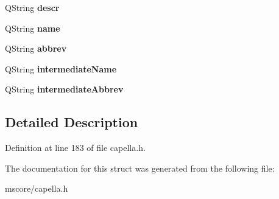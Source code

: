 \begin{DoxyCompactItemize}
Q\+String {\bfseries descr}
\item 
\mbox{\label{struct_ms_1_1_cap_staff_layout_a0687fa5d0f28cd72d1342d3419af2b5d}} 
Q\+String {\bfseries name}
\item 
\mbox{\label{struct_ms_1_1_cap_staff_layout_a2353607f0a3d1c18b1c822720caa90df}} 
Q\+String {\bfseries abbrev}
\item 
\mbox{\label{struct_ms_1_1_cap_staff_layout_a5d81109dbd328f77d55acd99c122246f}} 
Q\+String {\bfseries intermediate\+Name}
\item 
\mbox{\label{struct_ms_1_1_cap_staff_layout_a0db2b94b0a35a352fca7e1ca5707ded3}} 
Q\+String {\bfseries intermediate\+Abbrev}
\end{DoxyCompactItemize}


\subsection{Detailed Description}


Definition at line 183 of file capella.\+h.



The documentation for this struct was generated from the following file\+:\begin{DoxyCompactItemize}
\item 
mscore/capella.\+h\end{DoxyCompactItemize}
